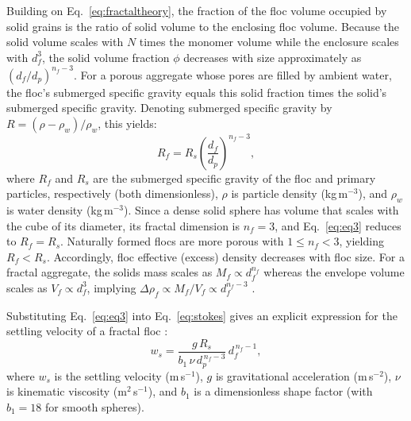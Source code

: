 \documentclass{agujournal2019}
\begin{document}
Building on Eq.~\eqref{eq:fractaltheory}, the fraction of the floc volume occupied by solid grains is the ratio of solid volume to the enclosing floc volume. Because the solid volume scales with $N$ times the monomer volume while the enclosure scales with $d_f^{3}$, the solid volume fraction $\phi$ decreases with size approximately as $(d_f/d_p)^{n_f-3}$. For a porous aggregate whose pores are filled by ambient water, the floc’s submerged specific gravity equals this solid fraction times the solid’s submerged specific gravity. Denoting submerged specific gravity by $R = (\rho - \rho_w)/\rho_w$, this yields:
\begin{equation}
R_f = R_s \left( \frac{d_f}{d_p} \right)^{n_f-3},
\label{eq:eq3}
\end{equation}
where $R_f$ and $R_s$ are the submerged specific gravity of the floc and primary particles, respectively (both dimensionless), $\rho$ is particle density (kg\,m$^{-3}$), and $\rho_w$ is water density (kg\,m$^{-3}$). Since a dense solid sphere has volume that scales with the cube of its diameter, its fractal dimension is $n_f = 3$, and Eq.~\eqref{eq:eq3} reduces to $R_f = R_s$. Naturally formed flocs are more porous with $1 \le n_f < 3$, yielding $R_f < R_s$. Accordingly, floc effective (excess) density decreases with floc size. For a fractal aggregate, the solids mass scales as $M_f \propto d_f^{n_f}$ whereas the envelope volume scales as $V_f \propto d_f^{3}$, implying $\Delta \rho_f \propto M_f / V_f \propto d_f^{n_f-3}$ \cite{kranenburg1994fractal}.

Substituting Eq.~\eqref{eq:eq3} into Eq.~\eqref{eq:stokes} gives an explicit expression for the settling velocity of a fractal floc \cite{strom2011explicit, winterwerp1998simple}:
\begin{equation}
w_s = \frac{g\,R_s}{b_1\,\nu\,d_p^{\,n_f-3}}\, d_f^{\,n_f-1},
\label{eq:floc_settling}
\end{equation}
where $w_s$ is the settling velocity (m\,s$^{-1}$), $g$ is gravitational acceleration (m\,s$^{-2}$), $\nu$ is kinematic viscosity (m$^{2}$\,s$^{-1}$), and $b_1$ is a dimensionless shape factor (with $b_1 = 18$ for smooth spheres).
\end{document}
